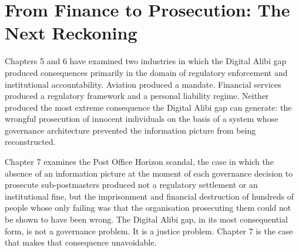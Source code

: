 \scenebreak

\section{From Finance to Prosecution: The Next Reckoning}

Chapters 5 and 6 have examined two industries in which the Digital Alibi gap produced consequences primarily in the domain of regulatory enforcement and institutional accountability. Aviation produced a mandate. Financial services produced a regulatory framework and a personal liability regime. Neither produced the most extreme consequence the Digital Alibi gap can generate: the wrongful prosecution of innocent individuals on the basis of a system whose governance architecture prevented the information picture from being reconstructed.

Chapter 7 examines the Post Office Horizon scandal, the case in which the absence of an information picture at the moment of each governance decision to prosecute sub-postmasters produced not a regulatory settlement or an institutional fine, but the imprisonment and financial destruction of hundreds of people whose only failing was that the organisation prosecuting them could not be shown to have been wrong. The Digital Alibi gap, in its most consequential form, is not a governance problem. It is a justice problem. Chapter 7 is the case that makes that consequence unavoidable.
